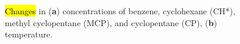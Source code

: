 \documentclass[mathematics,article,accept,pdftex,moreauthors]{Definitions/mdpi}
\begin{document}
	\vspace{-12pt} 
	\begin{figure}[H]
		\hspace{-15pt} 	
		\begin{minipage}{0.5\linewidth}
		\end{minipage}
		\begin{minipage}{0.5\linewidth}
		\end{minipage}
		\caption{\hl{Changes} 
 in (\textbf{a}) concentrations of benzene, cyclohexane (CH*), methyl cyclopentane (MCP), and cyclopentane (CP), (\textbf{b}) temperature.}\label{fig:res2}
	\end{figure}  
	
\end{document}
